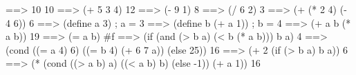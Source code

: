 \begtt\out
==> 10
10
==> (+ 5 3 4)
12
==> (- 9 1)
8
==> (/ 6 2)
3
==> (+ (* 2 4) (- 4 6))
6
==> (define a 3)
; a = 3
==> (define b (+ a 1))
; b = 4
==> (+ a b (* a b))
19
==> (= a b)
#f
==> (if (and (> b a) (< b (* a b)))
        b
        a)
4
==> (cond ((= a 4) 6)
          ((= b 4) (+ 6 7 a))
          (else 25))
16
==> (+ 2 (if (> b a) b a))
6
==> (* (cond ((> a b) a)
             ((< a b) b)
             (else -1))
       (+ a 1))
16
\endtt

